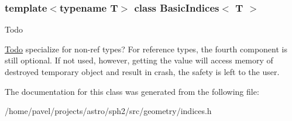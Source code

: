 \subsubsection*{template$<$typename T$>$\newline
class Basic\+Indices$<$ T $>$}

\begin{DoxyRefDesc}{Todo}
\item[\hyperlink{todo__todo000008}{Todo}]specialize for non-\/ref types? For reference types, the fourth component is still optional. If not used, however, getting the value will access memory of destroyed temporary object and result in crash, the safety is left to the user. \end{DoxyRefDesc}


The documentation for this class was generated from the following file\+:\begin{DoxyCompactItemize}
\item 
/home/pavel/projects/astro/sph2/src/geometry/indices.\+h\end{DoxyCompactItemize}
